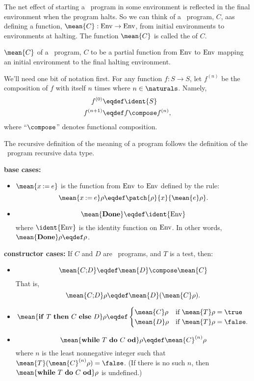 The net effect of starting a \while\ program in some environment is reflected in the
final environment when the program halts.  So we can think of a \while\ program, $C$,
aas defining a function, $\mean{C}:\Env \to \Env$, from initial
environments to environments at halting.  The function $\mean{C}$ is
called the  of $C$.

$\mean{C}$ of a \while\ program, $C$ to be a partial function from $\text{Env}$ to $\text{Env}$
mapping an initial environment to the final halting environment.

We'll need one bit of notation first.  For any function $f:S \to S$, let
$f^{(n)}$ be the composition of $f$ with itself $n$ times where $n \in
\naturals$.   Namely,
\begin{align*}
f^{(0)} & \eqdef \ident{S}\\
f^{(n+1)} & \eqdef f \compose f^{(n)},
\end{align*}
where ``$\compose$'' denotes functional composition.

The recursive definition of the meaning of a program follows the
definition of the \while\ program recursive data type.
\begin{definition}

\textbf{base cases:}
\begin{itemize}

\item $\mean{x \assigned e}$ is the function from $\text{Env}$ to $\text{Env}$ defined
  by the rule:
\[
\mean{x \assigned e}\rho \eqdef \patch{\rho}{x}{\mean{e}\rho}.
\]

\item
\[
\mean{\halt} \eqdef \ident{\Env}
\]
where $\ident{\Env}$ is the identity function on $\text{Env}$.  In other words,
$\mean{\halt}\rho \eqdef \rho$.

\end{itemize}

\textbf{constructor cases:}
If $C$ and $D$ are \while\ programs, and $T$ is a test, then:
\begin{itemize}

\item
\[
\mean{\seqcomm{C}{D}} \eqdef \mean{D} \compose \mean{C}
\]
That is,
\[
\mean{\seqcomm{C}{D}}\rho \eqdef \mean{D}(\mean{C}\rho).
\]

\item
\[
\mean{\condcomm{T}{C}{D}}\rho
\eqdef
\begin{cases}
\mean{C}\rho & \text{if } \mean{T}\rho = \true\\
\mean{D}\rho & \text{if } \mean{T}\rho = \false.
\end{cases}
\]

\item
\[
\mean{\wloop{T}{C}}\rho \eqdef \mean{C}^{(n)}\rho
\]
where $n$ is the least nonnegative integer such that
$\mean{T}(\mean{C}^{(n)}\rho) = \false$.  (If there is no such $n$, then
$\mean{\wloop{T}{C}}\rho$ is undefined.)
\end{itemize}

\end{definition}

